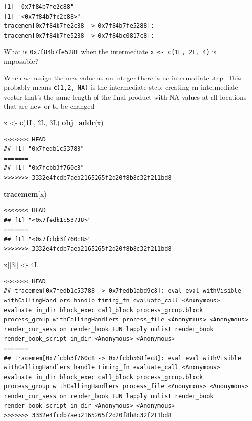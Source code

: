\documentclass[]{book}
\newenvironment{Shaded}{\begin{snugshade}}{\end{snugshade}}
\newcommand{\DecValTok}[1]{\textcolor[rgb]{0.00,0.00,0.81}{#1}}
\newcommand{\KeywordTok}[1]{\textcolor[rgb]{0.13,0.29,0.53}{\textbf{#1}}}
\newcommand{\NormalTok}[1]{#1}
\newcommand{\StringTok}[1]{\textcolor[rgb]{0.31,0.60,0.02}{#1}}
\begin{document}
\begin{verbatim}
[1] "0x7f84b7fe2c88"
[1] "<0x7f84b7fe2c88>"
tracemem[0x7f84b7fe2c88 -> 0x7f84b7fe5288]: 
tracemem[0x7f84b7fe5288 -> 0x7f84bc0817c8]: 
\end{verbatim}

What is \texttt{0x7f84b7fe5288} when the intermediate \texttt{x\ \textless{}-\ c(1L,\ 2L,\ 4)} is impossible?

When we assign the new value as an integer there is no intermediate step. This probably means \texttt{c(1,2,\ NA)} is the intermediate step; creating an intermediate vector that's the same length of the final product with NA values at all locations that are new or to be changed

\begin{Shaded}
\begin{Highlighting}[]
\NormalTok{x <-}\StringTok{ }\KeywordTok{c}\NormalTok{(1L, 2L, 3L)}
\KeywordTok{obj_addr}\NormalTok{(x)}
\end{Highlighting}
\end{Shaded}

\begin{verbatim}
<<<<<<< HEAD
## [1] "0x7fedb1c53788"
=======
## [1] "0x7fcbb3f760c8"
>>>>>>> 3332e4fcdb7aeb2165265f2d20f8b8c32f211bd8
\end{verbatim}

\begin{Shaded}
\begin{Highlighting}[]
\KeywordTok{tracemem}\NormalTok{(x)}
\end{Highlighting}
\end{Shaded}

\begin{verbatim}
<<<<<<< HEAD
## [1] "<0x7fedb1c53788>"
=======
## [1] "<0x7fcbb3f760c8>"
>>>>>>> 3332e4fcdb7aeb2165265f2d20f8b8c32f211bd8
\end{verbatim}

\begin{Shaded}
\begin{Highlighting}[]
\NormalTok{x[[}\DecValTok{3}\NormalTok{]] <-}\StringTok{ }\NormalTok{4L}
\end{Highlighting}
\end{Shaded}

\begin{verbatim}
<<<<<<< HEAD
## tracemem[0x7fedb1c53788 -> 0x7fedb1abd9c8]: eval eval withVisible withCallingHandlers handle timing_fn evaluate_call <Anonymous> evaluate in_dir block_exec call_block process_group.block process_group withCallingHandlers process_file <Anonymous> <Anonymous> render_cur_session render_book FUN lapply unlist render_book render_book_script in_dir <Anonymous> <Anonymous>
=======
## tracemem[0x7fcbb3f760c8 -> 0x7fcbb568fec8]: eval eval withVisible withCallingHandlers handle timing_fn evaluate_call <Anonymous> evaluate in_dir block_exec call_block process_group.block process_group withCallingHandlers process_file <Anonymous> <Anonymous> render_cur_session render_book FUN lapply unlist render_book render_book_script in_dir <Anonymous> <Anonymous>
>>>>>>> 3332e4fcdb7aeb2165265f2d20f8b8c32f211bd8
\end{verbatim}
\end{document}
